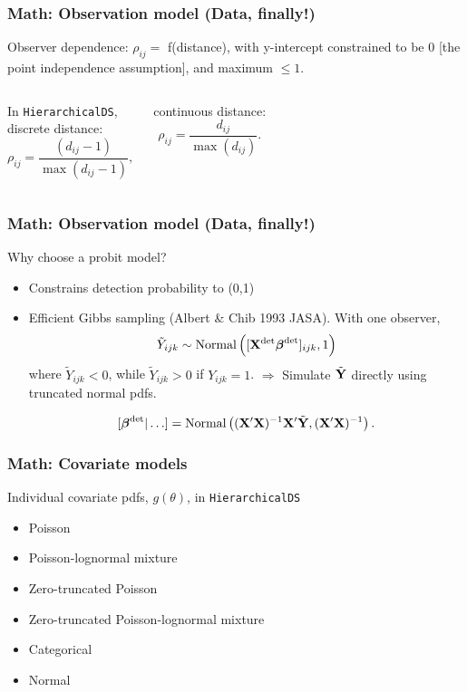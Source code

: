 \documentclass[serif,mathserif]{beamer}
\begin{document}
\begin{frame}
  \frametitle{Math: Observation model (Data, finally!)}
  Observer dependence: $\rho_{ij} =$ f(distance), with
  y-intercept constrained to be 0 [the point independence assumption], and maximum $\le 1$.\pause

  \begin{columns}[c]
  \column{1.8in}
  \vspace{.2cm}

   In {\tt HierarchicalDS},\\

   \vspace{.2cm}
  discrete distance:
    $$
    \rho_{ij}=\frac{(d_{ij}-1)}{\max(d_{ij}-1)},
    $$

    \vspace{.5cm}
  continuous distance:
    $$
    \rho_{ij}=\frac{d_{ij}}{\max(d_{ij})}.
    $$
  \column{2in}
  \end{columns}
\end{frame}

\begin{frame}
  \frametitle{Math: Observation model (Data, finally!)}
  Why choose a probit model?
  \begin{itemize}
    \item Constrains detection probability to (0,1) \pause
    \item Efficient Gibbs sampling (Albert \& Chib 1993 JASA). With
        one observer,
        $$
        \tilde{Y}_{ijk} \sim \textrm{Normal} \left( [{\bf X}^{\rm det} \boldsymbol{\beta}^{\rm det}]_{ijk},1  \right)
        $$
        where $\tilde{Y}_{ijk}<0$, while $\tilde{Y}_{ijk}>0$ if $Y_{ijk}=1$.
        {\color{noaaturq} $\Rightarrow$ Simulate $\tilde{\bf Y}$ directly using
        truncated normal pdfs.} \pause \\

        \hspace{.2cm}

        $$
        [\boldsymbol{\beta}^{\rm det}|\hdots]=\textrm{Normal}\left( ({\bf X}^\prime {\bf X})^{-1}{\bf X}^\prime \tilde{{\bf Y}},
        ({\bf X}^\prime {\bf X})^{-1} \right).
        $$

  \end{itemize}
\end{frame}

\begin{frame}
  \frametitle{Math: Covariate models}
  \begin{block}{Individual covariate pdfs, $g(\theta)$, in {\tt HierarchicalDS}}
  \begin{itemize}
    \item Poisson
    \item Poisson-lognormal mixture
    \item Zero-truncated Poisson
    \item Zero-truncated Poisson-lognormal mixture
    \item Categorical
    \item Normal
  \end{itemize}
  \end{block}
\end{frame}
\end{document}
